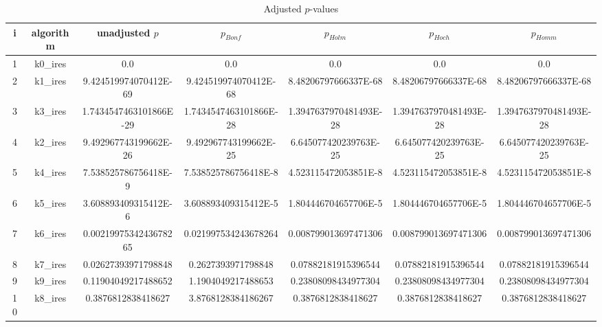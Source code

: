 \documentclass[a4paper,10pt]{article}
\begin{document}
\begin{landscape}
\begin{table}[!htp]
\centering\tiny
\caption{Adjusted $p$-values}
\begin{tabular}{ccccccc}
i&algorithm&unadjusted $p$&$p_{Bonf}$&$p_{Holm}$&$p_{Hoch}$&$p_{Homm}$\\
\hline
1&k0_ires&0.0&0.0&0.0&0.0&0.0\\
2&k1_ires&9.424519974070412E-69&9.424519974070412E-68&8.48206797666337E-68&8.48206797666337E-68&8.48206797666337E-68\\
3&k3_ires&1.7434547463101866E-29&1.7434547463101866E-28&1.3947637970481493E-28&1.3947637970481493E-28&1.3947637970481493E-28\\
4&k2_ires&9.492967743199662E-26&9.492967743199662E-25&6.645077420239763E-25&6.645077420239763E-25&6.645077420239763E-25\\
5&k4_ires&7.538525786756418E-9&7.538525786756418E-8&4.523115472053851E-8&4.523115472053851E-8&4.523115472053851E-8\\
6&k5_ires&3.608893409315412E-6&3.608893409315412E-5&1.804446704657706E-5&1.804446704657706E-5&1.804446704657706E-5\\
7&k6_ires&0.0021997534243678265&0.021997534243678264&0.008799013697471306&0.008799013697471306&0.008799013697471306\\
8&k7_ires&0.02627393971798848&0.2627393971798848&0.07882181915396544&0.07882181915396544&0.07882181915396544\\
9&k9_ires&0.11904049217488652&1.1904049217488653&0.23808098434977304&0.23808098434977304&0.23808098434977304\\
10&k8_ires&0.3876812838418627&3.8768128384186267&0.3876812838418627&0.3876812838418627&0.3876812838418627\\
\hline
\end{tabular}
\end{table}


\end{landscape}
\end{document}
